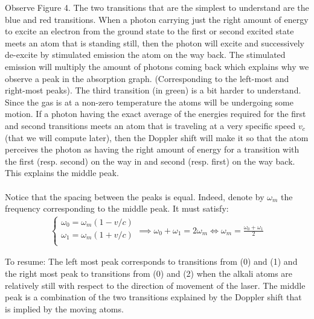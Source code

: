 \documentclass[10pt,a4paper]{article}
\begin{document}
Observe Figure 4. The two transitions that are the simplest to understand are the blue and red transitions. When a photon carrying just the right amount of energy to excite an electron from the ground state to the first or second excited state meets an atom that is standing still, then the photon will excite  and successively de-excite by stimulated emission the atom on the way back. The stimulated emission will multiply the amount of photons coming back which explains why we observe a peak in the absorption graph. (Corresponding to the left-most and right-most peaks). The third transition (in green) is a bit harder to understand. Since the gas is at a non-zero temperature the atoms will be undergoing some motion. If a photon having the exact average of the energies required for the first and second transitions meets an atom that is traveling at a very specific speed $v_c$ (that we will compute later), then the Doppler shift will make it so that the atom perceives the photon as having the right amount of energy for a transition with the first (resp. second) on the way in and second (resp. first) on the way back. This explains the middle peak. \\\\
Notice that the spacing between the peaks is equal. Indeed, denote by $\omega_m$ the frequency corresponding to the middle peak. It must satisfy:
\begin{align*}
    \begin{cases}
    \omega_0 = \omega_m (1-v/c) \\
    \omega_1 = \omega_m (1+v/c) \\
    \end{cases}
    \implies \omega_0 + \omega_1 = 2\omega_m \iff \omega_m = \frac{\omega_0 + \omega_1}{2}
\end{align*}

To resume: The left most peak corresponds to transitions from (0) and (1) and the right most peak to transitions from (0) and (2) when the alkali atoms are relatively still with respect to the direction of movement of the laser. The middle peak is a combination of the two transitions explained by the Doppler shift that is implied by the moving atoms. 
\end{document}
